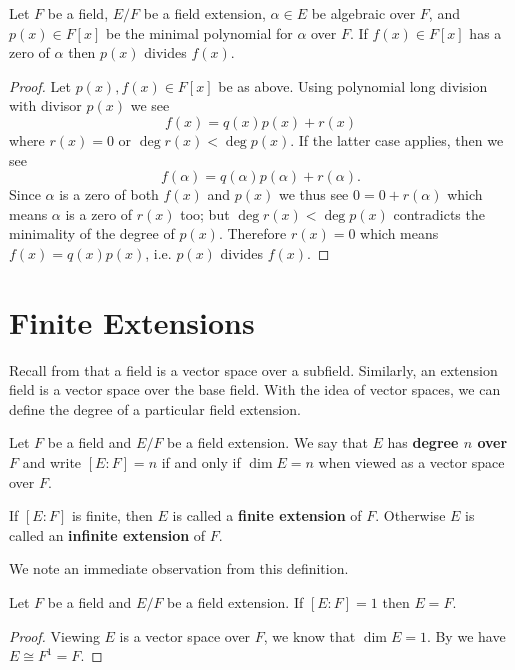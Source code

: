 \begin{corollary}\label{corollary-minimal-polynomial-divides-polynomial-with-same-root}
    Let $F$ be a field, $E/F$ be a field extension, $\alpha \in E$ be algebraic over $F$, and $p(x) \in F[x]$ be the minimal polynomial for $\alpha$ over $F$. If $f(x) \in F[x]$ has a zero of $\alpha$ then $p(x)$ divides $f(x)$.
\end{corollary}
\begin{proof}
    Let $p(x), f(x) \in F[x]$ be as above. Using polynomial long division with divisor $p(x)$ we see
    \[
        f(x) = q(x)p(x) + r(x)
    \]
    where $r(x) = 0$ or $\deg r(x) < \deg p(x)$. If the latter case applies, then we see
    \[
        f(\alpha) = q(\alpha)p(\alpha) + r(\alpha).
    \]
    Since $\alpha$ is a zero of both $f(x)$ and $p(x)$ we thus see $0 = 0 + r(\alpha)$ which means $\alpha$ is a zero of $r(x)$ too; but $\deg r(x) < \deg p(x)$ contradicts the minimality of the degree of $p(x)$. Therefore $r(x) = 0$ which means $f(x) = q(x)p(x)$, i.e. $p(x)$ divides $f(x)$.
\end{proof}

\section{Finite Extensions}
Recall from  that a field is a vector space over a subfield. Similarly, an extension field is a vector space over the base field. With the idea of vector spaces, we can define the degree of a particular field extension.

\begin{definition}
    Let $F$ be a field and $E/F$ be a field extension. We say that $E$ has \textbf{degree $n$ over $F$} and write $[E:F] = n$ if and only if $\dim E = n$ when viewed as a vector space over $F$.

    If $[E:F]$ is finite, then $E$ is called a \textbf{finite extension} of $F$. Otherwise $E$ is called an \textbf{infinite extension} of $F$.
\end{definition}

We note an immediate observation from this definition.
\begin{proposition}\label{prop-finite-extension-of-degree-1-means-extension-equals-base-field}
    Let $F$ be a field and $E/F$ be a field extension. If $[E:F] = 1$ then $E = F$.
\end{proposition}
\begin{proof}
    Viewing $E$ is a vector space over $F$, we know that $\dim E = 1$. By  we have $E\cong F^1 = F$.
\end{proof}

